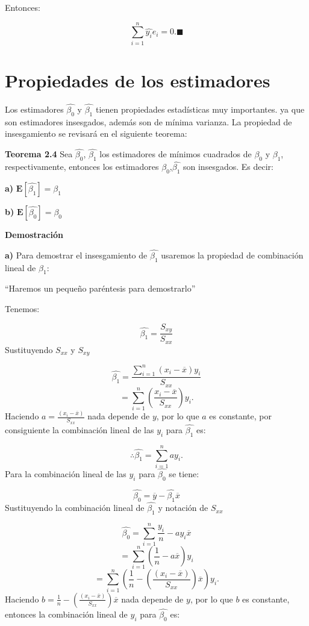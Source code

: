 \documentclass[
  a4paper,
  oneside,
  openany]{book}
\begin{document}
Entonces:

\[\sum_{i=1}^{n}\hat{y_{i}}e_{i}=0. \blacksquare\]

\hypertarget{propiedades-de-los-estimadores}{%
\section{Propiedades de los estimadores}\label{propiedades-de-los-estimadores}}

Los estimadores \(\hat{\beta_{0}}\) y \(\hat{\beta_{1}}\) tienen propiedades estadísticas muy importantes. ya que son estimadores insesgados, además son de mínima varianza. La propiedad de insesgamiento se revisará en el siguiente teorema:

\textbf{Teorema 2.4} Sea \(\hat{\beta_{0}}\), \(\hat{\beta_{1}}\) los estimadores de mínimos cuadrados de \(\beta_{0}\) y \(\beta_{1}\), respectivamente, entonces los estimadores \(\hat{\beta_{0}}\),\(\hat{\beta_{1}}\) son insesgados. Es decir:

\textbf{a)} \(\mathbf{E}\left[\hat{\beta_{1}}\right]=\beta_{1}\)

\textbf{b)} \(\mathbf{E}\left[\hat{\beta_{0}}\right]=\beta_{0}\)

\textbf{Demostración}

\textbf{a)} Para demostrar el insesgamiento de \(\hat{\beta_{1}}\) usaremos la propiedad de combinación lineal de \(\beta_{1}:\)

``Haremos un pequeño paréntesis para demostrarlo''

Tenemos:

\[\hat{\beta_{1}}=\frac{S_{xy}}{S_{xx}}\]
Sustituyendo \(S_{xx}\) y \(S_{xy}\)

\[\hat{\beta_{1}}=\frac{\sum_{i=1}^{n}(x_{i}-\overline{x})y_{i}}{S_{xx}}\]
\[=\sum_{i=1}^{n}\left(\frac{x_{i}-\overline{x}}{S_{xx}}\right)y_{i}.\]
Haciendo \(a=\frac{(x_{i}-\overline{x})}{S_{xx}}\) nada depende de \(y\), por lo que \(a\) es constante, por consiguiente la combinación lineal de las \(y_{i}\) para \(\hat{\beta_{1}}\) es:

\[\therefore \hat{\beta_{1}}=\sum_{i=1}^{n}ay_{i}.\]
Para la combinación lineal de las \(y_{i}\) para \(\hat{\beta_{0}}\) se tiene:

\[\hat{\beta_{0}}=\overline{y}-\hat{\beta_{1}}\overline{x}\]
Sustituyendo la combinación lineal de \(\hat{\beta_{1}}\) y notación de \(S_{xx}\)

\[\hat{\beta_{0}}=\sum_{i=1}^{n}\frac{y_{i}}{n}-ay_{i}\overline{x}\]
\[=\sum_{i=1}^{n}(\frac{1}{n}-a\overline{x})y_{i}\]
\[=\sum_{i=1}^{n}\left(\frac{1}{n}-\left(\frac{(x_{i}-\overline{x})}{S_{xx}}\right)\overline{x}\right)y_{i}. \]
Haciendo \(b=\frac{1}{n}-\left(\frac{(x_{i}-\overline{x})}{S_{xx}}\right)\overline{x}\) nada depende de \(y\), por lo que \(b\) es constante, entonces la combinación lineal de \(y_{i}\) para \(\hat{\beta_{0}}\) es:
\end{document}
